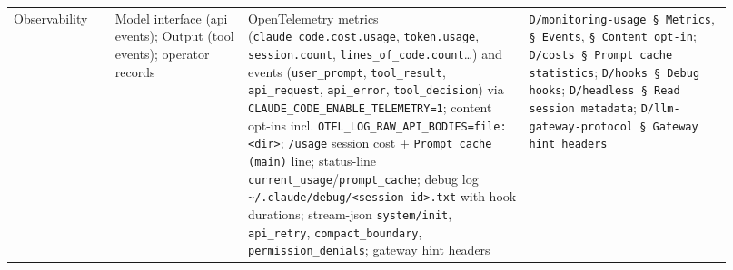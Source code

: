 \begin{longtable}{@{}p{0.13\linewidth}p{0.17\linewidth}p{0.36\linewidth}p{0.26\linewidth}@{}}
Observability & Model interface (api events); Output (tool events); operator records & OpenTelemetry metrics (\texttt{claude\_\allowbreak{}code.\allowbreak{}cost.\allowbreak{}usage}, \texttt{token.\allowbreak{}usage}, \texttt{session.\allowbreak{}count}, \texttt{lines\_\allowbreak{}of\_\allowbreak{}code.\allowbreak{}count}\ldots{}) and events (\texttt{user\_\allowbreak{}prompt}, \texttt{tool\_\allowbreak{}result}, \texttt{api\_\allowbreak{}request}, \texttt{api\_\allowbreak{}error}, \texttt{tool\_\allowbreak{}decision}) via \texttt{CLAUDE\_\allowbreak{}CODE\_\allowbreak{}ENABLE\_\allowbreak{}TELEMETRY=1}; content opt-ins incl. \texttt{OTEL\_\allowbreak{}LOG\_\allowbreak{}RAW\_\allowbreak{}API\_\allowbreak{}BODIES=file:\allowbreak{}<dir>}; \texttt{/\allowbreak{}usage} session cost + \texttt{Prompt cache (\allowbreak{}main)} line; status-line \texttt{current\_\allowbreak{}usage}/\texttt{prompt\_\allowbreak{}cache}; debug log \texttt{\textasciitilde{}/\allowbreak{}.\allowbreak{}claude/\allowbreak{}debug/\allowbreak{}<session-\allowbreak{}id>.\allowbreak{}txt} with hook durations; stream-json \texttt{system/\allowbreak{}init}, \texttt{api\_\allowbreak{}retry}, \texttt{compact\_\allowbreak{}boundary}, \texttt{permission\_\allowbreak{}denials}; gateway hint headers & \texttt{D/\allowbreak{}monitoring-\allowbreak{}usage § Metrics}, \texttt{§ Events}, \texttt{§ Content opt-\allowbreak{}in}; \texttt{D/\allowbreak{}costs § Prompt cache statistics}; \texttt{D/\allowbreak{}hooks § Debug hooks}; \texttt{D/\allowbreak{}headless § Read session metadata}; \texttt{D/\allowbreak{}llm-\allowbreak{}gateway-\allowbreak{}protocol § Gateway hint headers} \\

\end{longtable}
